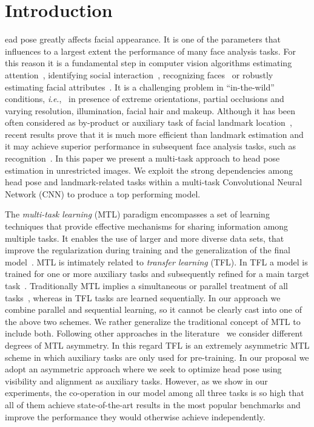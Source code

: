 \documentclass[9pt,technote,compsoc]{IEEEtran}
\newcommand{\ie}{\textit{i}.\textit{e}., }
\begin{document}
\IEEEdisplaynontitleabstractindextext


\IEEEpeerreviewmaketitle



\section{Introduction}\label{sec:introduction}





ead pose greatly affects facial appearance. It is one of the parameters that influences to a largest extent the performance of many face analysis tasks. For this reason it is a fundamental step in computer vision algorithms estimating attention~\cite{Bergasa08}, identifying social interaction~\cite{Ba11}, recognizing faces~\cite{Chang17} or robustly estimating facial attributes~\cite{Kumar18b,Ranjan19}.
It is a challenging problem in ``in-the-wild'' conditions, \ie\ in presence of extreme orientations, partial occlusions and varying resolution, illumination, facial hair and makeup. Although it has been often considered as by-product or auxiliary task of facial landmark location~\cite{Wu19}, recent results prove that it is much more efficient than landmark estimation and it may achieve superior performance in subsequent face analysis tasks, such as recognition~\cite{Chang17}.
In this paper we present a multi-task approach to head pose estimation in unrestricted images. We exploit the strong dependencies among head pose and landmark-related tasks within a multi-task Convolutional Neural Network (CNN) to produce a top performing model. 


The \emph{multi-task learning} (MTL) paradigm encompasses a set of learning techniques that provide effective mechanisms for sharing information among multiple tasks. It enables the use of larger and more diverse data sets, that improve the regularization during training and the generalization of the final model~\cite{Caruana97}. 
MTL is intimately related to \emph{transfer learning} (TFL). In TFL a model is trained for one or more auxiliary tasks and subsequently refined for a main target task~\cite{Razavian14,Zamir18}. Traditionally MTL implies a simultaneous or parallel treatment of all tasks~\cite{Caruana97}, whereas in TFL tasks are learned sequentially. In our approach we combine parallel and sequential learning, so it cannot be clearly cast into one of the above two schemes. We rather generalize the traditional concept of MTL to include both. Following other approaches in the literature~\cite{Lee16} we consider different degrees of MTL asymmetry.  In this regard TFL is an extremely asymmetric MTL scheme in which auxiliary tasks are only used for pre-training. 
In our proposal we adopt an asymmetric approach where we seek to optimize head pose using visibility and alignment as auxiliary tasks. However, as we show in our experiments, the co-operation in our model among all three tasks is so high that all of them achieve state-of-the-art results in the most popular benchmarks and improve the performance they would otherwise achieve independently.
\end{document}
